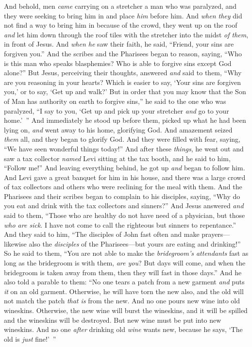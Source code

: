 \begin{biblechapter}
\verse And behold, men \textit{came} carrying on a stretcher a man who was paralyzed, and they were seeking to bring him in and place \textit{him}﻿ before him.
\verse And \textit{when they} did not find a way to bring him in because of the crowd, they went up on the roof \textit{and} let him down through the roof tiles with the stretcher into the midst \textit{of them}, in front of Jesus.
\verse And \textit{when he} saw their faith, he said, “Friend, your sins are forgiven you.”
\verse And the scribes and the Pharisees began to reason, saying, “Who is this man who speaks blasphemies? Who is able to forgive sins except God alone?”
\verse But Jesus, perceiving their thoughts, answered \textit{and} said to them, “Why are you reasoning in your hearts?
\verse Which is easier to say, ‘Your sins are forgiven you,’ or to say, ‘Get up and walk?’
\verse But in order that you may know that the Son of Man has authority on earth to forgive sins,” he said to the one who was paralyzed, “I say to you, ‘Get up and pick up your stretcher \textit{and} go to your home.’ ”
\verse And immediately he stood up before them, picked up what he had been lying on, \textit{and} went away to his home, glorifying God.
\verse And amazement seized \textit{them} all, and they began to glorify God. And they were filled with fear, saying, “We have seen wonderful things today!”
 And after these \textit{things}, he went out and saw a tax collector \textit{named} Levi sitting at the tax booth, and he said to him, “Follow me!”
\verse And leaving everything behind, he got up \textit{and} began to follow him.
\verse And Levi gave a great banquet for him in his house, and there was a large crowd of tax collectors and others who were reclining for the meal with them.
\verse And the Pharisees and their scribes began to complain to his disciples, saying, “Why do you eat and drink with the tax collectors and sinners?”
\verse And Jesus answered \textit{and} said to them, “Those who are healthy do not have need of a physician, but those \textit{who are sick}.
\verse I have not come to call the righteous but sinners to repentance.”
 And they said to him, “The disciples of John fast often and make prayers—likewise also the \textit{disciples} of the Pharisees—but yours are eating and drinking!”
\verse So he said to them, “You are not able to make the \textit{bridegroom’s attendants} fast as long as the bridegroom is with them, \textit{are you}?
\verse But days will come, and when the bridegroom is taken away from them, then they will fast in those days.”
\verse And he also told a parable to them: “No one tears a patch from a new garment \textit{and} puts \textit{it} on an old garment. Otherwise, he will have torn the new also, and the old will not match the patch \textit{that is} from the new.
\verse And no one pours new wine into old wineskins. Otherwise, the new wine will burst the wineskins, and it will be spilled and the wineskins will be destroyed.
\verse But new wine must be put into new wineskins.
\verse And no one \textit{after} drinking old \textit{wine} wants new, because he says, ‘The old is \textit{just} fine!’ ”
\end{biblechapter}

